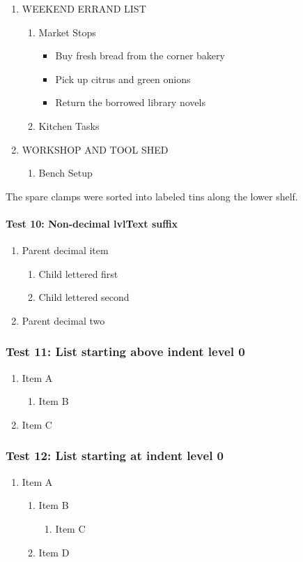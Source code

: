 \documentclass[11pt,a4paper]{article}
\begin{document}
\begin{enumerate}
\item WEEKEND ERRAND LIST
  \begin{enumerate}
\item Market Stops
    \begin{itemize}
\item Buy fresh bread from the corner bakery
\item Pick up citrus and green onions
\item Return the borrowed library novels
    \end{itemize}
\item Kitchen Tasks
  \end{enumerate}
\item WORKSHOP AND TOOL SHED
  \begin{enumerate}
\item Bench Setup
  \end{enumerate}
\end{enumerate}

The spare clamps were sorted into labeled tins along the lower shelf.

\paragraph{Test 10: Non-decimal lvlText suffix}

\begin{enumerate}
\item Parent decimal item
  \begin{enumerate}
\item Child lettered first
\item Child lettered second
  \end{enumerate}
\item Parent decimal two
\end{enumerate}

\subsubsection{Test 11: List starting above indent level 0}

\begin{enumerate}
\item Item A
  \begin{enumerate}
\item Item B
  \end{enumerate}
\item Item C
\end{enumerate}

\subsubsection{Test 12: List starting at indent level 0}

\begin{enumerate}
\item Item A
  \begin{enumerate}
\item Item B
    \begin{enumerate}
\item Item C
    \end{enumerate}
\item Item D
  \end{enumerate}
\end{enumerate}
\end{document}
